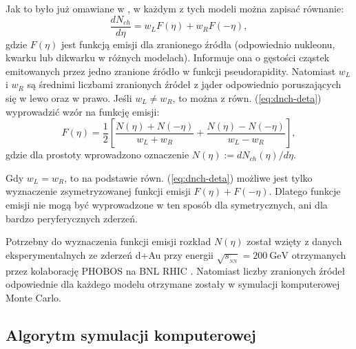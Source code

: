 \documentclass[a4paper,12pt]{article}
\begin{document}
Jak to było już omawiane w \cite{Bialas:1976ed, Barej:pracaInz18, Barej:2017kcw}, w każdym z tych modeli można zapisać równanie:
\begin{equation} \label{eq:dnch-deta}
\frac{dN_{ch}}{d\eta} = w_{L} F(\eta) + w_{R} F(-\eta),
\end{equation}
gdzie $F(\eta)$ jest funkcją emisji dla zranionego źródła (odpowiednio nukleonu, kwarku lub dikwarku w różnych modelach). Informuje ona o gęstości cząstek emitowanych przez jedno zranione źródło w funkcji pseudorapidity. Natomiast $w_{L}$ i $w_{R}$ są średnimi liczbami zranionych źródeł \quad \quad z jąder odpowiednio poruszających się w lewo oraz w prawo. Jeśli $w_{L} \neq w_{R}$, to można z równ. (\ref{eq:dnch-deta}) wyprowadzić wzór na funkcję emisji:
\begin{equation} \label{eq:fragm-fun}
F(\eta) = \frac{1}{2} \left[ \frac{N(\eta) + N(-\eta)}{w_{L} + w_{R}} + \frac{N(\eta) - N(-\eta)}{w_{L} - w_{R}} \right],
\end{equation}
gdzie dla prostoty wprowadzono oznaczenie $N(\eta) := dN_{ch}(\eta)/d\eta$.

Gdy $w_{L} = w_{R}$, to na podstawie równ. (\ref{eq:dnch-deta}) możliwe jest tylko wyznaczenie zsymetryzowanej funkcji emisji $F(\eta) + F(-\eta)$. Dlatego funkcje emisji nie mogą być wyprowadzone w ten sposób dla symetrycznych, ani dla bardzo peryferycznych zderzeń.

Potrzebny do wyznaczenia funkcji emisji rozkład $N(\eta)$ został wzięty z danych eksperymentalnych ze zderzeń d+Au przy energii $\sqrt{s_{_{NN}}} = 200~\text{GeV}$ otrzymanych przez kolaborację PHOBOS na BNL RHIC \cite{Back:2004mr}. Natomiast liczby zranionych źródeł odpowiednie dla każdego modelu otrzymane zostały w symulacji komputerowej Monte Carlo.

\subsection{Algorytm symulacji komputerowej} \label{algorytm}
\end{document}
